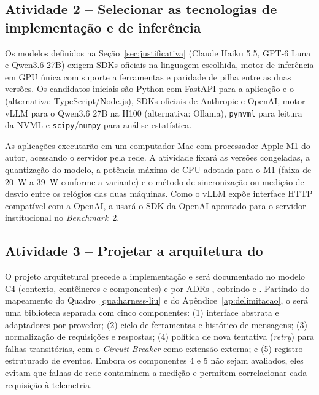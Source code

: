 \subsection{Atividade 2 -- Selecionar as tecnologias de implementação e de inferência}
\label{subsec:at-tecnologias}

Os modelos definidos na Seção~\ref{sec:justificativa} (Claude Haiku 5.5,
GPT-6 Luna e Qwen3.6 27B) exigem SDKs oficiais na linguagem escolhida, motor de
inferência em GPU única com suporte a ferramentas e paridade de pilha entre as
duas versões. Os candidatos iniciais são Python com FastAPI para a aplicação e o
\harness{} (alternativa: TypeScript/Node.js), SDKs oficiais de Anthropic e
OpenAI, motor vLLM para o Qwen3.6 27B na H100 (alternativa: Ollama),
\texttt{pynvml} para leitura da NVML \cite{nvml} e \texttt{scipy}/\texttt{numpy}
para análise estatística.

As aplicações executarão em um computador Mac com processador Apple M1 do
autor, acessando o servidor pela rede. A atividade fixará as versões congeladas,
a quantização do modelo, a potência máxima de CPU adotada para o M1 (faixa de
20~W a 39~W conforme a variante) e o método de sincronização ou medição de
desvio entre os relógios das duas máquinas. Como o vLLM expõe interface HTTP
compatível com a OpenAI, a \versaoD{} usará o SDK da OpenAI apontado para o
servidor institucional no \textit{Benchmark}~2.

\subsection{Atividade 3 -- Projetar a arquitetura do \harness}
\label{subsec:at-projeto}

O projeto arquitetural precede a implementação e será documentado no modelo C4
(contexto, contêineres e componentes) \cite{brown-c4} e por ADRs
\cite{tyree2005}, cobrindo \versaoH{} e \versaoD{}. Partindo do mapeamento do Quadro~\ref{qua:harness-liu} e do
Apêndice~\ref{ap:delimitacao}, o \harness{} será uma biblioteca separada com
cinco componentes: (1) interface abstrata e adaptadores por provedor; (2) ciclo
de ferramentas e histórico de mensagens; (3) normalização de requisições e
respostas; (4) política de nova tentativa (\textit{retry}) para falhas
transitórias, com o \textit{Circuit Breaker} como extensão externa; e (5)
registro estruturado de eventos. Embora os componentes 4 e 5 não sejam
avaliados, eles evitam que falhas de rede contaminem a medição e permitem
correlacionar cada requisição à telemetria.

